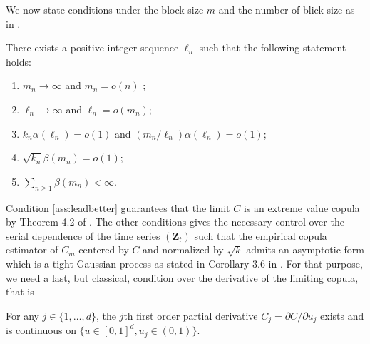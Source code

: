 \documentclass[11pt]{article}
\theoremstyle{definition}
\newenvironment{Assumption}[1]
  {\renewcommand\theinnerassumption{#1}\innerassumption}
  {\endinnerassumption}
\begin{document}
	We now state conditions under the block size $m$ and the number of blick size as in \cite{bucher2014extreme}.
	
	\begin{Assumption}{C}
	\label{ass:regularity}
	There exists a positive integer sequence $\ell_n$ such that the following statement holds:
	\begin{enumerate}[label=(\roman*)]
	\item $m_n \rightarrow \infty$ and $m_n = o (n)$ ; \label{ass:m=o(n)}
	\item $\ell_n \rightarrow \infty$ and $\ell_n = o(m_n)$;
	\item $k_n \alpha(\ell_n) = o(1)$ and $(m_n / \ell_n) \alpha(\ell_n) = o(1)$; \label{ass:leadbetter}
	\item $\sqrt{k_n} \beta(m_n) = o(1)$;
	\item $\sum_{n \geq 1} \beta(m_n) < \infty$. \label{ass:series}
	\end{enumerate}
	\end{Assumption}
	
	Condition \ref{ass:leadbetter} guarantees that the limit $C$ is an extreme value copula by Theorem 4.2 of \cite{hsing1989extreme}. The other conditions gives the necessary control over the serial dependence of the time series $(\textbf{Z}_t)$ such that the empirical copula estimator of $C_m$ centered by $C$ and normalized by $\sqrt{k}$ admits an asymptotic form  which is a tight Gaussian process as stated in Corollary 3.6 in \cite{bucher2014extreme}. For that purpose, we need a last, but classical, condition over the derivative of the limiting copula, that is
	
	\begin{Assumption}{D}
	\label{ass:smooth}
	For any $j \in \{1,\dots,d\}$, the $j$th first order partial derivative $\dot{C}_j = \partial C / \partial u_j$ exists and is continuous on $\{ u \in [0,1]^d, u_j \in (0,1)\}$.
	\end{Assumption}
	
\end{document}

